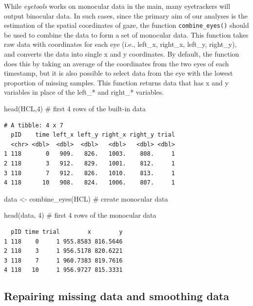 \documentclass[
  man,
  floatsintext,
  longtable,
  nolmodern,
  notxfonts,
  notimes,
  colorlinks=true,linkcolor=blue,citecolor=blue,urlcolor=blue]{apa7}
\newenvironment{Shaded}{\begin{snugshade}}{\end{snugshade}}
\newcommand{\CommentTok}[1]{\textcolor[rgb]{0.37,0.37,0.37}{#1}}
\newcommand{\DecValTok}[1]{\textcolor[rgb]{0.68,0.00,0.00}{#1}}
\newcommand{\FunctionTok}[1]{\textcolor[rgb]{0.28,0.35,0.67}{#1}}
\newcommand{\NormalTok}[1]{\textcolor[rgb]{0.00,0.23,0.31}{#1}}
\newcommand{\OtherTok}[1]{\textcolor[rgb]{0.00,0.23,0.31}{#1}}
\begin{document}
While \emph{eyetools} works on monocular data in the main, many
eyetrackers will output binocular data. In such cases, since the primary
aim of our analyses is the estimation of the spatial coordinates of
gaze, the function \texttt{combine\_eyes()} should be used to combine
the data to form a set of monocular data. This function takes raw data
with coordinates for each eye (i.e., left\_x, right\_x, left\_y,
right\_y), and converts the data into single x and y coordinates. By
default, the function does this by taking an average of the coordinates
from the two eyes of each timestamp, but it is also possible to select
data from the eye with the lowest proportion of missing samples. This
function returns data that has x and y variables in place of the left\_*
and right\_* variables.

\begin{Shaded}
\begin{Highlighting}[]
\FunctionTok{head}\NormalTok{(HCL,}\DecValTok{4}\NormalTok{) }\CommentTok{\# first 4 rows of the built{-}in data}
\end{Highlighting}
\end{Shaded}

\begin{verbatim}
# A tibble: 4 x 7
  pID    time left_x left_y right_x right_y trial
  <chr> <dbl>  <dbl>  <dbl>   <dbl>   <dbl> <dbl>
1 118       0   909.   826.   1003.    808.     1
2 118       3   912.   829.   1001.    812.     1
3 118       7   912.   826.   1010.    813.     1
4 118      10   908.   824.   1006.    807.     1
\end{verbatim}

\begin{Shaded}
\begin{Highlighting}[]
\NormalTok{data }\OtherTok{\textless{}{-}} \FunctionTok{combine\_eyes}\NormalTok{(HCL) }\CommentTok{\# create monocular data }

\FunctionTok{head}\NormalTok{(data, }\DecValTok{4}\NormalTok{) }\CommentTok{\# first 4 rows of the monocular data}
\end{Highlighting}
\end{Shaded}

\begin{verbatim}
  pID time trial        x        y
1 118    0     1 955.8583 816.5646
2 118    3     1 956.5178 820.6221
3 118    7     1 960.7383 819.7616
4 118   10     1 956.9727 815.3331
\end{verbatim}

\subsection{Repairing missing data and smoothing
data}\label{repairing-missing-data-and-smoothing-data}
\end{document}
